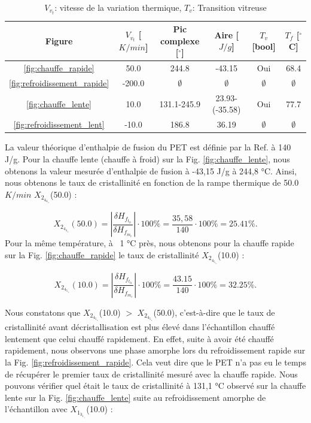 \begin{table}[!ht]
\centering
\footnotesize
\setlength{\tabcolsep}{4pt}
\renewcommand{\arraystretch}{0.9}
\begin{tabular}{|c|c|c|c|c|c|}
\hline
        \textbf{Figure}
        & \textbf{$V_v_t$ [$K/min$]}
        & \textbf{Pic complexe [$^\circ$]}
        & \textbf{Aire [$J/g$]}
        & \textbf{$T_v$ [bool]}
	& \textbf{$T_f$ [$^\circ$C]}
\\\hline
	\ref{fig:chauffe_rapide} & 50.0 & 244.8 & -43.15 & Oui & 68.4 \\
	\ref{fig:refroidissement_rapide} & -200.0 & $\emptyset$ & $\emptyset$ & $\emptyset$ & $\emptyset$\\
	\ref{fig:chauffe_lente} & 10.0 & 131.1-245.9 & 23.93-(-35.58) & Oui & 77.7 \\
	\ref{fig:refroidissement_lent} & -10.0 & 186.8 & 36.19 & $\emptyset$ & $\emptyset$ \\
\hline
\end{tabular}
        \caption{$V_v_t$: vitesse de la variation thermique, $T_v$: Transition vitreuse}
\label{val:peaks}
\end{table}
La valeur théorique d’enthalpie de fusion du PET est définie par la Ref. \cite{petnet} à 140 J/g. Pour la chauffe lente (chauffe à froid) sur la Fig. \ref{fig:chauffe_lente}, nous obtenons la valeur mesurée d’enthalpie de fusion à -43,15 J/g à 244,8 °C. Ainsi, nous obtenons le taux de cristallinité en fonction de la rampe thermique de 50.0 $K/min$ $X_2_4_4_._8$(50.0) :


\[
	X_2_4_4_._8(50.0) = |\frac{\delta H_f_t_h}{\delta H_f_m_e}| \cdot 100\% = \frac{35,58}{140} \cdot 100 \% = 25.41 \%.
\]
Pour la même température, à ~1 °C près, nous obtenons pour la chauffe rapide sur la Fig. \ref{fig:chauffe_rapide} le taux de cristallinité $X_2_4_5_._9$(10.0) :

\[
	X_2_4_5_._9(10.0) = |\frac{\delta H_f_t_h}{\delta H_f_m_e}| \cdot 100\% = \frac{43.15}{140} \cdot 100\% = 32.25 \%.
\]

Nous constatons que $X_2_4_5_._9$(10.0) $>$ $X_2_4_5_._9$(50.0), c’est-à-dire que le taux de cristallinité avant décristallisation est plus élevé dans l’échantillon chauffé lentement que celui chauffé rapidement. En effet, suite à avoir été chauffé rapidement, nous observons une phase amorphe lors du refroidissement rapide sur la Fig. \ref{fig:refroidissement_rapide}. Cela veut dire que le PET n’a pas eu le temps de récupérer le premier taux de cristallinité mesuré avec la chauffe rapide. Nous pouvons vérifier quel était le taux de cristallinité à 131,1 °C observé sur la chauffe lente sur la Fig. \ref{fig:chauffe_lente} suite au refroidissement amorphe de l’échantillon avec $X_1_3_1_._1$(10.0) :

